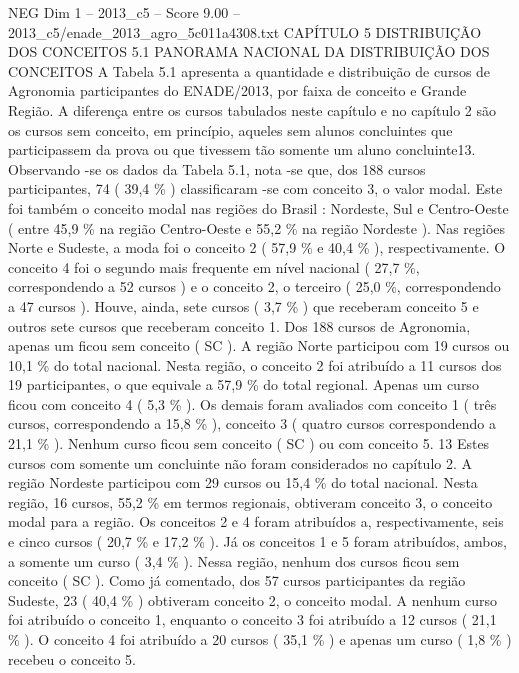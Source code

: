 \begin{textsample}{NEG Dim 1 – 2013\_c5 – Score 9.00 – 2013\_c5/enade\_2013\_agro\_5c011a4308.txt}  \label{ex:f1_neg_357}
CAPÍTULO 5 DISTRIBUIÇÃO DOS CONCEITOS 5.1 PANORAMA NACIONAL DA DISTRIBUIÇÃO DOS CONCEITOS A Tabela 5.1 apresenta a quantidade e distribuição de cursos de Agronomia participantes do ENADE/2013, por faixa de conceito e Grande Região.
A diferença entre os cursos tabulados neste capítulo e no capítulo 2 são os cursos sem conceito, em princípio, aqueles sem alunos concluintes que participassem da prova ou que tivessem tão somente um aluno concluinte13.
Observando -se os dados da Tabela 5.1, nota -se que, dos 188 cursos participantes, 74 ( 39,4 \% ) classificaram -se com conceito 3, o valor modal.
Este foi também o conceito modal nas regiões do Brasil : Nordeste, Sul e Centro-Oeste ( entre 45,9 \% na região Centro-Oeste e 55,2 \% na região Nordeste ).
Nas regiões Norte e Sudeste, a moda foi o conceito 2 ( 57,9 \% e 40,4 \% ), respectivamente.
O conceito 4 foi o segundo mais frequente em nível nacional ( 27,7 \%, correspondendo a 52 cursos ) e o conceito 2, o terceiro ( 25,0 \%, correspondendo a 47 cursos ).
Houve, ainda, sete cursos ( 3,7 \% ) que receberam conceito 5 e outros sete cursos que receberam conceito 1.
Dos 188 cursos de Agronomia, apenas um ficou sem conceito ( SC ).
A região Norte participou com 19 cursos ou 10,1 \% do total nacional.
Nesta região, o conceito 2 foi atribuído a 11 cursos dos 19 participantes, o que equivale a 57,9 \% do total regional.
Apenas um curso ficou com conceito 4 ( 5,3 \% ).
Os demais foram avaliados com conceito 1 ( três cursos, correspondendo a 15,8 \% ), conceito 3 ( quatro cursos correspondendo a 21,1 \% ).
Nenhum curso ficou sem conceito ( SC ) ou com conceito 5. 13 Estes cursos com somente um concluinte não foram considerados no capítulo 2.
A região Nordeste participou com 29 cursos ou 15,4 \% do total nacional.
Nesta região, 16 cursos, 55,2 \% em termos regionais, obtiveram conceito 3, o conceito modal para a região.
Os conceitos 2 e 4 foram atribuídos a, respectivamente, seis e cinco cursos ( 20,7 \% e 17,2 \% ).
Já os conceitos 1 e 5 foram atribuídos, ambos, a somente um curso ( 3,4 \% ).
Nessa região, nenhum dos cursos ficou sem conceito ( SC ).
Como já comentado, dos 57 cursos participantes da região Sudeste, 23 ( 40,4 \% ) obtiveram conceito 2, o conceito modal.
A nenhum curso foi atribuído o conceito 1, enquanto o conceito 3 foi atribuído a 12 cursos ( 21,1 \% ).
O conceito 4 foi atribuído a 20 cursos ( 35,1 \% ) e apenas um curso ( 1,8 \% ) recebeu o conceito 5.

\end{textsample}
